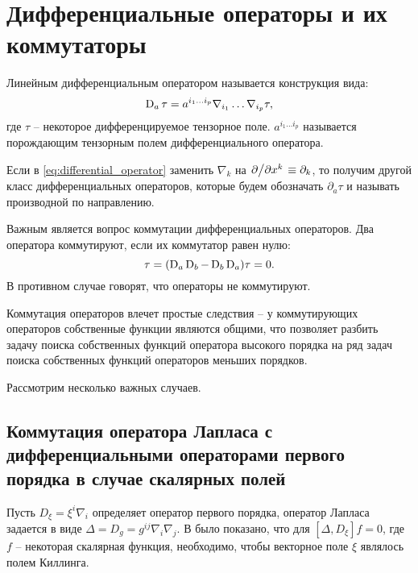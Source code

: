 \documentclass[12pt,a4paper]{article}
\begin{document}

    \section{Дифференциальные операторы и их коммутаторы\label{sec:commutators}}

        Линейным дифференциальным оператором называется конструкция вида:
        \begin{equation}\label{eq:differential_operator}
            \operatorname{D}_a\tau = a^{i_1 \dots i_p} \nabla_{i_1} \dots \nabla_{i_p} \tau ,
        \end{equation}
        где $\tau$ -- некоторое дифференцируемое тензорное поле. $a^{i_1 \dots i_p}$ называется порождающим тензорным полем дифференциального оператора.

        Если в \autoref{eq:differential_operator} заменить $\nabla_k$ на $\pdv*{x^k} \equiv \partial_k$, то получим другой класс дифференциальных операторов, которые будем обозначать $\partial_a\tau$ и называть производной по направлению.

        Важным является вопрос коммутации дифференциальных операторов. Два оператора коммутируют, если их коммутатор равен нулю:
        \begin{equation}
            [\D_a, \D_b]\tau = (\D_a \D_b - \D_b \D_a) \tau = 0 .
        \end{equation}
        В противном случае говорят, что операторы не коммутируют.

        Коммутация операторов влечет простые следствия -- у коммутирующих операторов собственные функции являются общими, что позволяет разбить задачу поиска собственных функций оператора высокого порядка на ряд задач поиска собственных функций операторов меньших порядков.

        Рассмотрим несколько важных случаев.

        \subsection{Коммутация оператора Лапласа с дифференциальными операторами первого порядка в случае скалярных полей}

            Пусть $D_\xi = \xi^i \nabla_i$ определяет оператор первого порядка, оператор Лапласа задается в виде $\Delta = D_g = g^{ij} \nabla_i \nabla_j$. В \cite{differential_operator_commutators} было показано, что для $[\Delta, D_\xi] f = 0$, где $f$ -- некоторая скалярная функция, необходимо, чтобы векторное поле $\xi$ являлось полем Киллинга.
\end{document}
